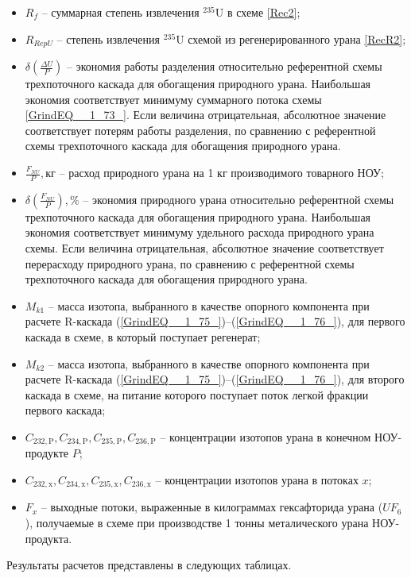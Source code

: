 \begin{itemize}
  \item $R_f$ -- суммарная степень извлечения $^{235}$U в схеме \ref{Rec2};
  \item $R_{RepU}$ -- степень извлечения $^{235}$U схемой из регенерированного урана \ref{RecR2};
  \item $\delta(\frac{\Delta U}{P})$ -- экономия работы разделения относительно референтной схемы трехпоточного каскада для обогащения природного урана. Наибольшая экономия соответствует минимуму суммарного потока схемы \ref{GrindEQ__1_73_}. Если величина отрицательная, абсолютное значение соответствует потерям работы разделения, по сравнению с референтной схемы трехпоточного каскада для обогащения природного урана.
  \item  $\frac{F_{NU}}{P}, \text{кг}$ -- расход природного урана на 1 кг производимого товарного НОУ;
  \item  $\delta(\frac{F_{NU}}{P}), \%$ -- экономия природного урана относительно референтной схемы трехпоточного каскада для обогащения природного урана.  Наибольшая экономия соответствует минимуму удельного расхода природного урана схемы. Если величина отрицательная, абсолютное значение соответствует перерасходу природного урана, по сравнению с референтной схемы трехпоточного каскада для обогащения природного урана.
  \item $M_{k1}$ -- масса изотопа, выбранного в качестве опорного компонента при расчете R-каскада (\ref{GrindEQ__1_75_})--(\ref{GrindEQ__1_76_}), для первого каскада в схеме, в который поступает регенерат;
  \item $M_{k2}$ -- масса изотопа, выбранного в качестве опорного компонента при расчете R-каскада (\ref{GrindEQ__1_75_})--(\ref{GrindEQ__1_76_}), для второго каскада в схеме, на питание которого поступает поток легкой фракции первого каскада;
  \item $C_{232,\text{P}},C_{234,\text{P}},C_{235,\text{P}},C_{236,\text{P}}$ -- концентрации изотопов урана в конечном НОУ-продукте $P$;
  \item $C_{232,\text{x}},C_{234,\text{x}},C_{235,\text{x}},C_{236,\text{x}}$ -- концентрации изотопов урана в потоках $x$;
  \item $F_{x}$ -- выходные потоки, выраженные в килограммах гексафторида урана ($UF_6$), получаемые в схеме при производстве 1 тонны металического урана НОУ-продукта.
\end{itemize}


Результаты расчетов представлены в следующих таблицах.




